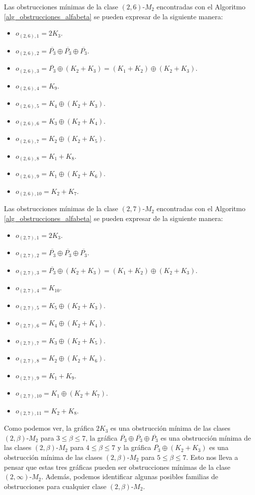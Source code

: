 Las obstrucciones mínimas de la clase $(2,6)$-$M_2$ encontradas con el Algoritmo \ref{alg_obstrucciones_alfabeta} se pueden expresar de la siguiente manera:
\begin{itemize}
    \item $o_{(2,6),1}=2K_3$.
    \item $o_{(2,6),2}=\overline{P_3}\oplus\overline{P_3}\oplus\overline{P_3}$.
    \item $o_{(2,6),3}=\overline{P_3}\oplus(K_2+K_3)=(K_1+K_2)\oplus(K_2+K_3)$.
    \item $o_{(2,6),4}=K_9$.
    \item $o_{(2,6),5}=K_4\oplus(K_2+K_3)$.
    \item $o_{(2,6),6}=K_3\oplus(K_2+K_4)$.
    \item $o_{(2,6),7}=K_2\oplus(K_2+K_5)$.
    \item $o_{(2,6),8}=K_1+K_8$.
    \item $o_{(2,6),9}=K_1\oplus(K_2+K_6)$.
    \item $o_{(2,6),10}=K_2+K_7$.
\end{itemize}

Las obstrucciones mínimas de la clase $(2,7)$-$M_2$ encontradas con el Algoritmo \ref{alg_obstrucciones_alfabeta} se pueden expresar de la siguiente manera:
\begin{itemize}
    \item $o_{(2,7),1}=2K_3$.
    \item $o_{(2,7),2}=\overline{P_3}\oplus\overline{P_3}\oplus\overline{P_3}$.
    \item $o_{(2,7),3}=\overline{P_3}\oplus(K_2+K_3)=(K_1+K_2)\oplus(K_2+K_3)$.
    \item $o_{(2,7),4}=K_{10}$.
    \item $o_{(2,7),5}=K_5\oplus(K_2+K_3)$.
    \item $o_{(2,7),6}=K_4\oplus(K_2+K_4)$.
    \item $o_{(2,7),7}=K_3\oplus(K_2+K_5)$.
    \item $o_{(2,7),8}=K_2\oplus(K_2+K_6)$.
    \item $o_{(2,7),9}=K_1+K_9$.
    \item $o_{(2,7),10}=K_1\oplus(K_2+K_7)$.
    \item $o_{(2,7),11}=K_2+K_8$.
\end{itemize}

Como podemos ver, la gráfica $2K_3$ es una obstrucción mínima de las clases $(2,\beta)$-$M_2$ para $3\le\beta\le7$, la gráfica $\overline{P_3}\oplus\overline{P_3}\oplus\overline{P_3}$ es una obstrucción mínima de las clases $(2,\beta)$-$M_2$ para $4\le\beta\le7$ y la gráfica $\overline{P_3}\oplus(K_2+K_3)$ es una obstrucción mínima de las clases $(2,\beta)$-$M_2$ para $5\le\beta\le7$. Esto nos lleva a pensar que estas tres gráficas pueden ser obstrucciones mínimas de la clase $(2,\infty)$-$M_2$. Además, podemos identificar algunas posibles familias de obstrucciones para cualquier clase $(2,\beta)$-$M_2$.  

